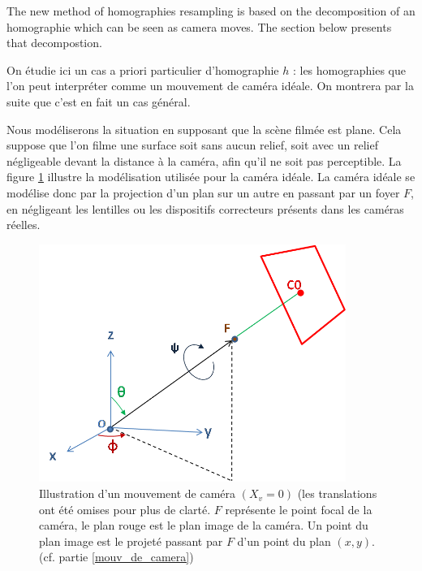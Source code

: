 The new method of homographies resampling is based on the decomposition of an homographie which can be seen as camera moves. The section below presents that decompostion.



\label{mouv_de_camera}
On étudie ici un cas a priori particulier d'homographie $h$ : les homographies que l'on peut interpréter comme un mouvement de caméra idéale. On montrera par la suite que c'est en fait un cas général.

Nous modéliserons la situation en supposant que la scène filmée est plane. Cela suppose que l'on filme une surface soit sans aucun relief, soit avec un relief négligeable devant la distance à la caméra, afin qu'il ne soit pas perceptible. La figure \ref{shmdecomp} illustre la modélisation utilisée pour la caméra idéale. La caméra idéale se modélise donc par la projection d'un plan sur un autre en passant par un foyer $F$, en négligeant les lentilles ou les dispositifs correcteurs présents dans les caméras réelles.

\begin{figure}[h!]

\centering
\includegraphics[width=10cm]{shema_decomp.png}
\caption{Illustration d'un mouvement de caméra $(X_v =0)$ (les translations ont été omises pour plus de clarté. $F$ représente le point focal de la caméra, le plan rouge est le plan image de la caméra. Un point du plan image est le projeté passant par $F$ d'un point du plan $(x,y)$. (cf. partie \ref{mouv_de_camera})}
\label{shmdecomp}
\end{figure}


